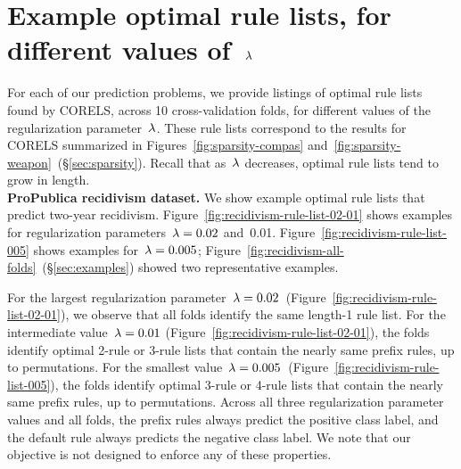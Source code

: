 \clearpage
\section{Example optimal rule lists, for different values of~${\lambda}$}
\label{appendix:examples}

For each of our prediction problems, we provide listings of
optimal rule lists found by CORELS, across 10 cross-validation folds,
for different values of the regularization parameter~${\lambda}$.
%
These rule lists correspond to the results for CORELS summarized
in Figures~\ref{fig:sparsity-compas} and~\ref{fig:sparsity-weapon}~(\S\ref{sec:sparsity}).
%
Recall that as~${\lambda}$ decreases, optimal rule lists tend to grow in length. \\

\textbf{ProPublica recidivism dataset.}
We show example optimal rule lists that predict two-year recidivism.
%
Figure~\ref{fig:recidivism-rule-list-02-01} shows examples for
regularization parameters~${{\lambda} = 0.02}$ and~0.01.
%
Figure~\ref{fig:recidivism-rule-list-005} shows examples for~${{\lambda} = 0.005}$;
Figure~\ref{fig:recidivism-all-folds}~(\S\ref{sec:examples}) showed two representative examples.

For the largest regularization parameter~${{\lambda} = 0.02}$~(Figure~\ref{fig:recidivism-rule-list-02-01}),
we observe that all folds identify the same length-1 rule list.
%
For the intermediate value~${{\lambda} = 0.01}$ (Figure~\ref{fig:recidivism-rule-list-02-01}),
the folds identify optimal 2-rule or 3-rule lists that contain the nearly same prefix rules,
up to permutations.
%
For the smallest value~${{\lambda} = 0.005}$~(Figure~\ref{fig:recidivism-rule-list-005}),
the folds identify optimal 3-rule or 4-rule lists that contain the nearly same prefix rules,
up to permutations.
%
Across all three regularization parameter values and all folds,
the prefix rules always predict the positive class label,
and the default rule always predicts the negative class label.
%
We note that our objective is not designed to enforce any of these properties.

